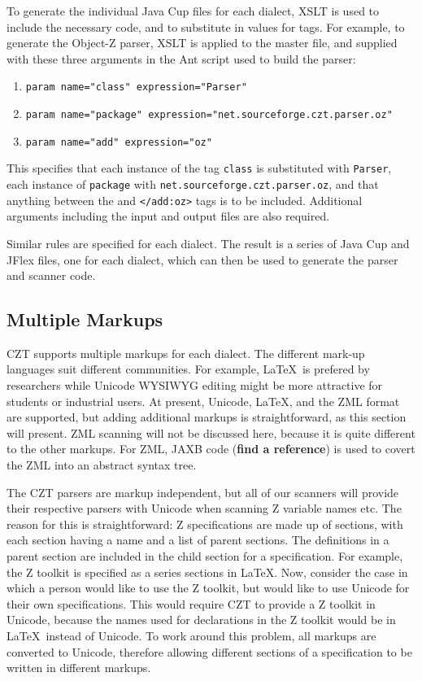 \documentclass{llncs}
\begin{document}
To generate the individual Java Cup files for each dialect, XSLT is
used to include the necessary code, and to substitute in values for
tags. For example, to generate the Object-Z parser, XSLT is applied to
the master file, and supplied with these three arguments in the Ant
script used to build the parser:
\begin{enumerate}
  \item {\tt param name="class" expression="Parser"}
  \item {\tt param name="package" expression="net.sourceforge.czt.parser.oz"}
  \item {\tt param name="add" expression="{oz}"}
\end{enumerate}

This specifies that each instance of the tag {\tt class} is
substituted with {\tt Parser}, each instance of {\tt package} with
{\tt net.sourceforge.czt.parser.oz}, and that anything between the
{\tt <add:oz>} and {\tt </add:oz>} tags is to be included. Additional
arguments including the input and output files are also required.

Similar rules are specified for each dialect. The result is a series
of Java Cup and JFlex files, one for each dialect, which can then be
used to generate the parser and scanner code.

\subsection{Multiple Markups}

 CZT supports multiple markups for each dialect.  The different
 mark-up languages suit different communities.  For example, \LaTeX\
 is prefered by researchers while Unicode WYSIWYG editing might be
 more attractive for students or industrial users. At present,
 Unicode, \LaTeX, and the ZML format \cite{UttEA:03} are supported,
 but adding additional markups is straightforward, as this section
 will present.  ZML scanning will not be discussed here, because it is
 quite different to the other markups. For ZML, JAXB code ({\bf find a
 reference}) is used to covert the ZML into an abstract syntax tree.

The CZT parsers are markup independent, but all of our scanners will
provide their respective parsers with Unicode when scanning Z variable
names etc. The reason for this is straightforward: Z specifications
are made up of sections, with each section having a name and a list of
parent sections. The definitions in a parent section are included in
the child section for a specification. For example, the Z toolkit is
specified as a series sections in \LaTeX. Now, consider the case in
which a person would like to use the Z toolkit, but would like to use
Unicode for their own specifications. This would require CZT to
provide a Z toolkit in Unicode, because the names used for
declarations in the Z toolkit would be in \LaTeX~instead of
Unicode. To work around this problem, all markups are converted to
Unicode, therefore allowing different sections of a specification to
be written in different markups.
\end{document}
